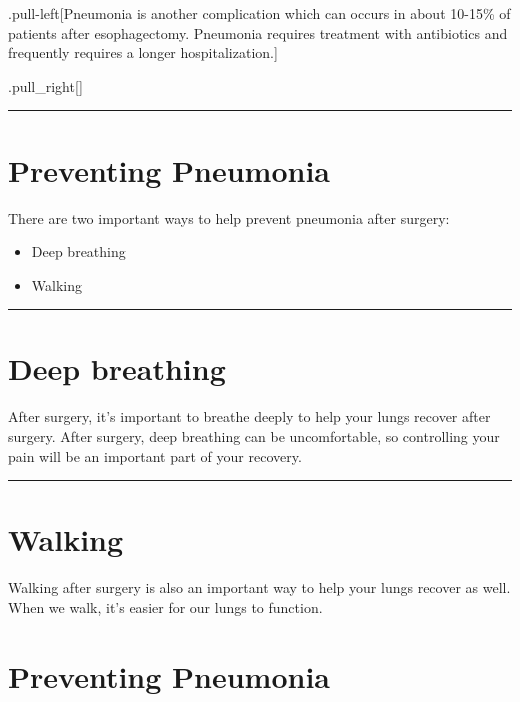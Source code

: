 \documentclass[
]{article}
\providecommand{\tightlist}{%
  \setlength{\itemsep}{0pt}\setlength{\parskip}{0pt}}
\begin{document}
.pull-left{[}Pneumonia is another complication which can occurs in about
10-15\% of patients after esophagectomy. Pneumonia requires treatment
with antibiotics and frequently requires a longer hospitalization.{]}

.pull\_right{[}{]}

\begin{center}\rule{0.5\linewidth}{0.5pt}\end{center}

\hypertarget{preventing-pneumonia}{%
\section{Preventing Pneumonia}\label{preventing-pneumonia}}

There are two important ways to help prevent pneumonia after surgery:

\begin{itemize}
\tightlist
\item
  Deep breathing
\item
  Walking
\end{itemize}

\begin{center}\rule{0.5\linewidth}{0.5pt}\end{center}

\hypertarget{deep-breathing}{%
\section{Deep breathing}\label{deep-breathing}}

After surgery, it's important to breathe deeply to help your lungs
recover after surgery. After surgery, deep breathing can be
uncomfortable, so controlling your pain will be an important part of
your recovery.

\begin{center}\rule{0.5\linewidth}{0.5pt}\end{center}

\hypertarget{walking}{%
\section{Walking}\label{walking}}

Walking after surgery is also an important way to help your lungs
recover as well. When we walk, it's easier for our lungs to function.

\hypertarget{preventing-pneumonia-1}{%
\section{Preventing Pneumonia}\label{preventing-pneumonia-1}}
\end{document}
